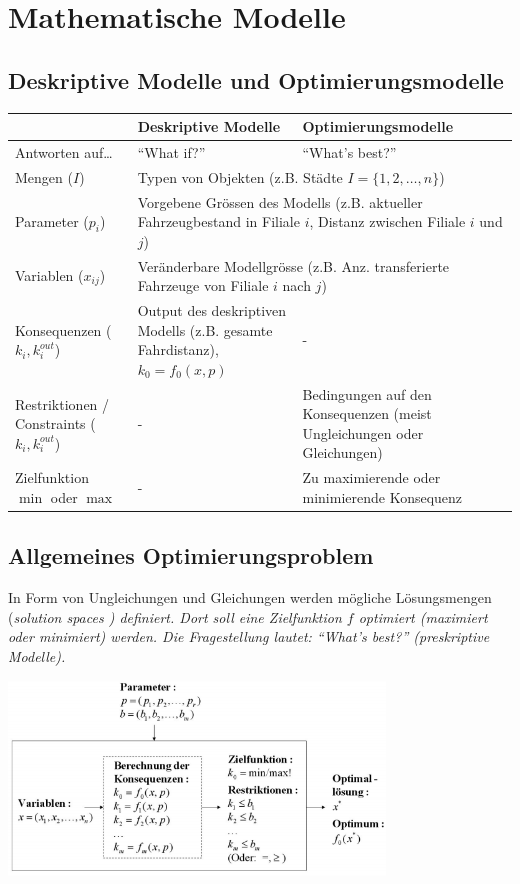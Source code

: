 \section{Mathematische Modelle }
\subsection{Deskriptive Modelle und Optimierungsmodelle }
  \begin{tabular}{|p{3.7cm}|p{7cm}|p{7cm}|}
    \hline
    & \textbf{Deskriptive Modelle}
    & \textbf{Optimierungsmodelle} \\
    \hline
    \hline
    Antworten auf\ldots
      & ``What if?''
      & ``What's best?'' \\
    \hline
    Mengen ($I$)
      & \multicolumn{2}{l|}{Typen von Objekten (z.B. Städte $I = \{1,2,\ldots,n\}$)} \\
    \hline
    Parameter ($p_i$)
      & \multicolumn{2}{p{14cm}|}{Vorgebene Grössen des Modells (z.B. aktueller Fahrzeugbestand in Filiale $i$, Distanz zwischen Filiale $i$ und $j$)} \\
    \hline
    Variablen ($x_{ij}$)
      & \multicolumn{2}{l|}{Veränderbare Modellgrösse (z.B. Anz. transferierte Fahrzeuge von Filiale $i$ nach $j$)} \\
    \hline
    Konsequenzen ($k_{i}, k_i^{out}$)
      & Output des deskriptiven Modells (z.B. gesamte Fahrdistanz), $k_0 = f_0(x,p)$ 
      & -\\
    \hline
    Restriktionen / Constraints ($k_{i}, k_i^{out}$)
      & - 
      & Bedingungen auf den Konsequenzen (meist Ungleichungen oder Gleichungen)\\
    \hline
    Zielfunktion $\min$ oder $\max$
      & - 
      & Zu maximierende oder minimierende Konsequenz\\
    \hline
  \end{tabular}


\subsection{Allgemeines Optimierungsproblem }
  In Form von Ungleichungen und Gleichungen werden mögliche Lösungsmengen (\em solution spaces \em) definiert. Dort soll eine Zielfunktion $f$ optimiert (maximiert oder minimiert) werden. Die Fragestellung lautet: "`What's best?"' (preskriptive Modelle).
  
  \begin{center}
    \includegraphics[width=10cm]{./Content/OptMathModels/OptimiziationModel}
  \end{center}
  
